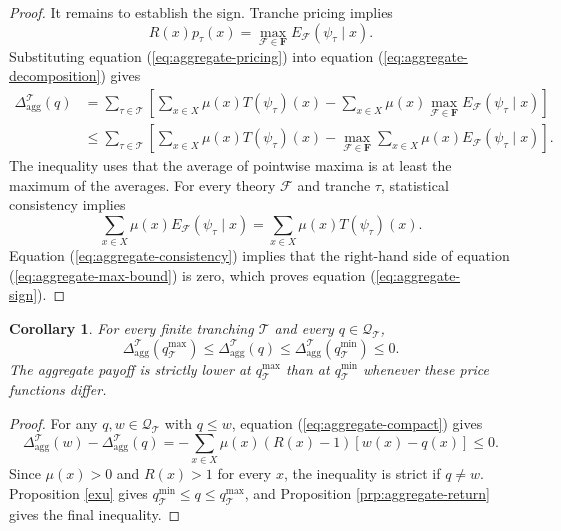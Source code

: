 \documentclass[11pt]{article}
\theoremstyle{plain}
\newtheorem{crl}{Corollary}%
\begin{document}
\begin{proof}
It remains to establish the sign. Tranche pricing implies
\begin{equation}\label{eq:aggregate-pricing}
R(x)p_\tau(x)
=
\max_{\mathcal{F}\in\mathbf{F}}
E_\mathcal{F}(\psi_\tau\mid x).
\end{equation}
Substituting equation (\ref{eq:aggregate-pricing}) into equation (\ref{eq:aggregate-decomposition}) gives
\begin{align}
\Delta_{\mathrm{agg}}^{\mathcal{T}}(q)
&=
\sum_{\tau\in\mathcal{T}}
\left[
\sum_{x\in X}\mu(x)T(\psi_\tau)(x)
-
\sum_{x\in X}\mu(x)
\max_{\mathcal{F}\in\mathbf{F}}E_\mathcal{F}(\psi_\tau\mid x)
\right]\label{eq:aggregate-max-representation}\\
&\leq
\sum_{\tau\in\mathcal{T}}
\left[
\sum_{x\in X}\mu(x)T(\psi_\tau)(x)
-
\max_{\mathcal{F}\in\mathbf{F}}
\sum_{x\in X}\mu(x)E_\mathcal{F}(\psi_\tau\mid x)
\right].\label{eq:aggregate-max-bound}
\end{align}
The inequality uses that the average of pointwise maxima is at least the maximum of the averages. For every theory $\mathcal{F}$ and tranche $\tau$, statistical consistency implies
\begin{equation}\label{eq:aggregate-consistency}
\sum_{x\in X}\mu(x)
E_\mathcal{F}(\psi_\tau\mid x)
=
\sum_{x\in X}\mu(x)T(\psi_\tau)(x).
\end{equation}
Equation (\ref{eq:aggregate-consistency}) implies that the right-hand side of equation (\ref{eq:aggregate-max-bound}) is zero, which proves equation (\ref{eq:aggregate-sign}).
\end{proof}

\begin{crl}\label{cor:aggregate-equilibria}
For every finite tranching $\mathcal{T}$ and every $q\in\mathcal{Q}_{\mathcal{T}}$,
\[
\Delta_{\mathrm{agg}}^{\mathcal{T}}(q_{\mathcal{T}}^{\max})
\leq
\Delta_{\mathrm{agg}}^{\mathcal{T}}(q)
\leq
\Delta_{\mathrm{agg}}^{\mathcal{T}}(q_{\mathcal{T}}^{\min})
\leq0.
\]
The aggregate payoff is strictly lower at $q_{\mathcal{T}}^{\max}$ than at $q_{\mathcal{T}}^{\min}$ whenever these price functions differ.
\end{crl}

\begin{proof}
For any $q,w\in\mathcal{Q}_{\mathcal{T}}$ with $q\leq w$, equation (\ref{eq:aggregate-compact}) gives
\[
\Delta_{\mathrm{agg}}^{\mathcal{T}}(w)
-\Delta_{\mathrm{agg}}^{\mathcal{T}}(q)
=-
\sum_{x\in X}\mu(x)(R(x)-1)\left[w(x)-q(x)\right]
\leq0.
\]
Since $\mu(x)>0$ and $R(x)>1$ for every $x$, the inequality is strict if $q\neq w$. Proposition \ref{exu} gives $q_{\mathcal{T}}^{\min}\leq q\leq q_{\mathcal{T}}^{\max}$, and Proposition \ref{prp:aggregate-return} gives the final inequality.
\end{proof}
\end{document}
